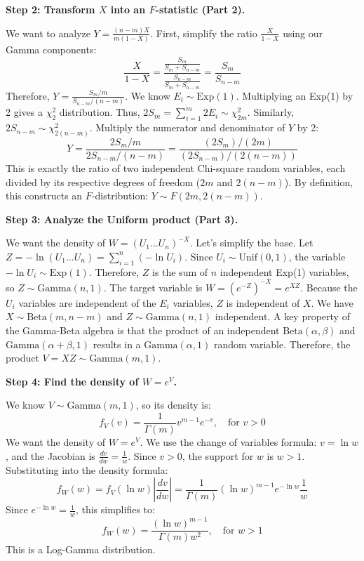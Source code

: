 \begin{solution}
\textbf{Step 2: Transform $X$ into an $F$-statistic (Part 2).}

We want to analyze $Y = \frac{(n-m)X}{m(1-X)}$.
First, simplify the ratio $\frac{X}{1-X}$ using our Gamma components:
\[ \frac{X}{1-X} = \frac{\frac{S_m}{S_m + S_{n-m}}}{\frac{S_{n-m}}{S_m + S_{n-m}}} = \frac{S_m}{S_{n-m}} \]
Therefore, $Y = \frac{S_m / m}{S_{n-m} / (n-m)}$.
We know $E_i \sim \text{Exp}(1)$. Multiplying an Exp(1) by 2 gives a $\chi^2_2$ distribution.
Thus, $2S_m = \sum_{i=1}^m 2E_i \sim \chi^2_{2m}$.
Similarly, $2S_{n-m} \sim \chi^2_{2(n-m)}$.
Multiply the numerator and denominator of $Y$ by 2:
\[ Y = \frac{2S_m / m}{2S_{n-m} / (n-m)} = \frac{(2S_m) / (2m)}{(2S_{n-m}) / (2(n-m))} \]
This is exactly the ratio of two independent Chi-square random variables, each divided by its respective degrees of freedom ($2m$ and $2(n-m)$).
By definition, this constructs an $F$-distribution: $Y \sim F(2m, 2(n-m))$.

\textbf{Step 3: Analyze the Uniform product (Part 3).}

We want the density of $W = (U_1 \dots U_n)^{-X}$.
Let's simplify the base. Let $Z = -\ln(U_1 \dots U_n) = \sum_{i=1}^n (-\ln U_i)$.
Since $U_i \sim \text{Unif}(0,1)$, the variable $-\ln U_i \sim \text{Exp}(1)$.
Therefore, $Z$ is the sum of $n$ independent Exp(1) variables, so $Z \sim \text{Gamma}(n, 1)$.
The target variable is $W = (e^{-Z})^{-X} = e^{XZ}$.
Because the $U_i$ variables are independent of the $E_i$ variables, $Z$ is independent of $X$.
We have $X \sim \text{Beta}(m, n-m)$ and $Z \sim \text{Gamma}(n, 1)$ independent.
A key property of the Gamma-Beta algebra is that the product of an independent $\text{Beta}(\alpha, \beta)$ and $\text{Gamma}(\alpha+\beta, 1)$ results in a $\text{Gamma}(\alpha, 1)$ random variable.
Therefore, the product $V = XZ \sim \text{Gamma}(m, 1)$.

\textbf{Step 4: Find the density of $W = e^V$.}

We know $V \sim \text{Gamma}(m, 1)$, so its density is:
\[ f_V(v) = \frac{1}{\Gamma(m)} v^{m-1} e^{-v}, \quad \text{for } v > 0 \]
We want the density of $W = e^V$. We use the change of variables formula:
$v = \ln w$, and the Jacobian is $\frac{dv}{dw} = \frac{1}{w}$.
Since $v > 0$, the support for $w$ is $w > 1$.
Substituting into the density formula:
\[ f_W(w) = f_V(\ln w) \left| \frac{dv}{dw} \right| = \frac{1}{\Gamma(m)} (\ln w)^{m-1} e^{-\ln w} \frac{1}{w} \]
Since $e^{-\ln w} = \frac{1}{w}$, this simplifies to:
\[ f_W(w) = \frac{(\ln w)^{m-1}}{\Gamma(m) w^2}, \quad \text{for } w > 1 \]
This is a Log-Gamma distribution.
\end{solution}


